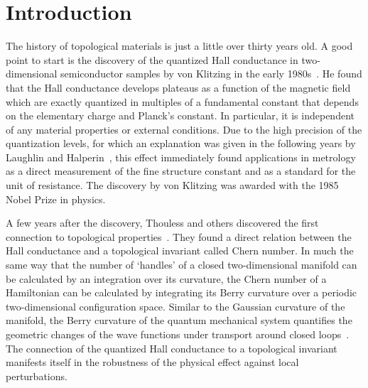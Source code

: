 \chapter*{Introduction}

The history of topological materials is just a little over thirty years old.
A good point to start is the discovery of the quantized Hall conductance in two-dimensional semiconductor samples by von Klitzing in the early 1980s~\cite{Klitzing1980,Klitzing1992}.
He found that the Hall conductance develops plateaus as a function of the magnetic field which are exactly quantized in multiples of a fundamental constant that depends on the elementary charge and Planck's constant.
In particular, it is independent of any material properties or external conditions.
Due to the high precision of the quantization levels, for which an explanation was given in the following years by Laughlin and Halperin~\cite{Laughlin1981,Halperin1982}, this effect immediately found applications in metrology as a direct measurement of the fine structure constant and as a standard for the unit of resistance.
The discovery by von Klitzing was awarded with the 1985 Nobel Prize in physics.

A few years after the discovery, Thouless and others discovered the first connection to topological properties~\cite{Thouless1982,Niu1985,Kohmoto1985,Avron1985,Kohmoto1989,Bellissard1994,Avron2003}.
They found a direct relation between the Hall conductance and a topological invariant called Chern number.
In much the same way that the number of `handles' of a closed two-dimensional manifold can be calculated by an integration over its curvature, the Chern number of a Hamiltonian can be calculated by integrating its Berry curvature over a periodic two-dimensional configuration space.
Similar to the Gaussian curvature of the manifold, the Berry curvature of the quantum mechanical system quantifies the geometric changes of the wave functions under transport around closed loops~\cite{Berry1984,Zak1989}.
The connection of the quantized Hall conductance to a topological invariant manifests itself in the robustness of the physical effect against local perturbations.

